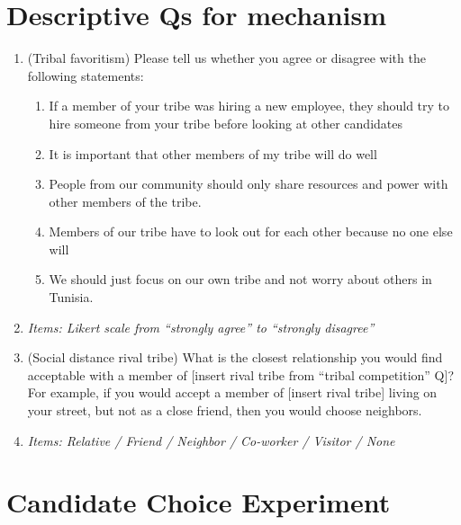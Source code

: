 \documentclass[12pt]{article}
\newcommand{\alerta}[1]{\textcolor{harvardcrimson}{#1}}
\begin{document}
\section*{Descriptive Qs for mechanism}
\begin{enumerate}


\item \alerta{(Tribal favoritism)}  Please tell us whether you agree or disagree with the following statements:
    \begin{enumerate}
        \item If a member of your tribe was hiring a new employee, they should try to hire someone from your tribe before looking at other candidates

        \item It is important that other members of my tribe will do well

        \item People from our community should only share resources and power with other members of the tribe.
        
        \item Members of our tribe have to look out for each other because no one else will

        \item We should just focus on our own tribe and not worry about others in Tunisia.
    \end{enumerate}
    
    \item[] \textit{Items: Likert scale from ``strongly agree'' to ``strongly disagree''}
    
       \item \alerta{(Social distance rival tribe)}  What is the closest relationship you would find acceptable with a member of [insert rival tribe from ``tribal competition'' Q]? For example, if you would accept a member of [insert rival tribe] living on your street, but not as a close friend, then you would choose neighbors.

    \item[] \textit{Items: Relative / Friend / Neighbor / Co-worker / Visitor / None}
    
    
\end{enumerate}

\section*{Candidate Choice Experiment}
\end{document}
